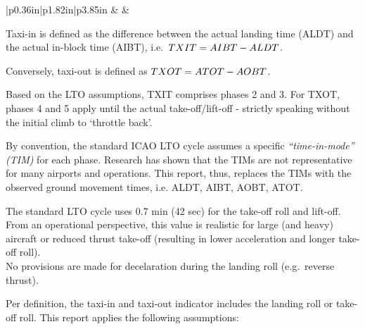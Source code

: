 \documentclass[
  a4paper,
  DIV=11,
  numbers=noendperiod]{scrreprt}
\begin{document}
\begin{longtable}[c]{|p{0.36in}|p{1.82in}|p{3.85in}}
 &  &  \\




\end{longtable}

Taxi-in is defined as the difference between the actual landing time
(ALDT) and the actual in-block time (AIBT),
i.e.~\(\small TXIT = AIBT - ALDT\).

Conversely, taxi-out is defined as \(\small TXOT = ATOT - AOBT\).

Based on the LTO assumptions, TXIT comprises phases 2 and 3. For TXOT,
phases 4 and 5 apply until the actual take-off/lift-off - strictly
speaking without the initial climb to `throttle back'.

By convention, the standard ICAO LTO cycle assumes a specific
\emph{``time-in-mode'' (TIM)} for each phase. Research has shown that
the TIMs are not representative for many airports and operations. This
report, thus, replaces the TIMs with the observed ground movement times,
i.e. ALDT, AIBT, AOBT, ATOT.

The standard LTO cycle uses 0.7 min (42 sec) for the take-off roll and
lift-off. From an operational perspective, this value is realistic for
large (and heavy) aircraft or reduced thrust take-off (resulting in
lower acceleration and longer take-off roll).\\
No provisions are made for decelaration during the landing roll
(e.g.~reverse thrust).

Per definition, the taxi-in and taxi-out indicator includes the landing
roll or take-off roll. This report applies the following assumptions:
\end{document}
